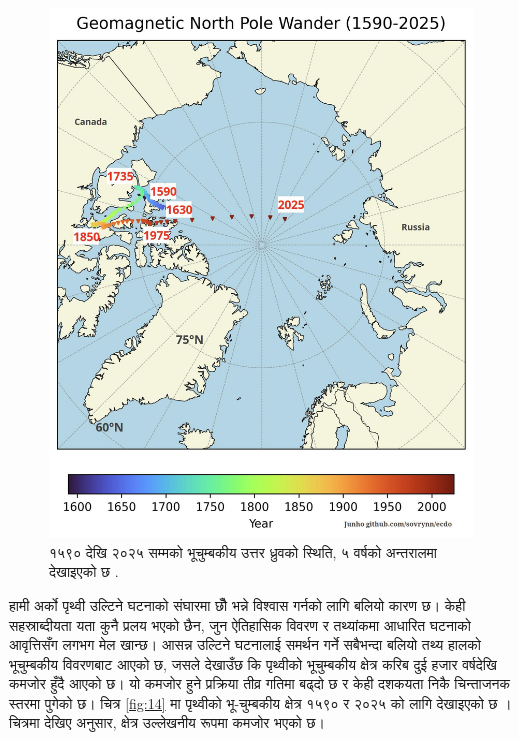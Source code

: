 \documentclass[10pt,twocolumn,letterpaper]{article}
\begin{document}
\begin{figure}[t]
\begin{center}
   \includegraphics[width=1\linewidth]{npw.jpg}
\end{center}
   \caption{१५९० देखि २०२५ सम्मको भूचुम्बकीय उत्तर ध्रुवको स्थिति, ५ वर्षको अन्तरालमा देखाइएको छ \cite{142}.}
\label{fig:13}
\label{fig:onecol}
\end{figure}

हामी अर्को पृथ्वी उल्टिने घटनाको संघारमा छौँ भन्ने विश्वास गर्नको लागि बलियो कारण छ। केही सहस्राब्दीयता यता कुनै प्रलय भएको छैन, जुन ऐतिहासिक विवरण र तथ्यांकमा आधारित घटनाको आवृत्तिसँग लगभग मेल खान्छ। आसन्न उल्टिने घटनालाई समर्थन गर्ने सबैभन्दा बलियो तथ्य हालको भूचुम्बकीय विवरणबाट आएको छ, जसले देखाउँछ कि पृथ्वीको भूचुम्बकीय क्षेत्र करिब दुई हजार वर्षदेखि कमजोर हुँदै आएको छ। यो कमजोर हुने प्रक्रिया तीव्र गतिमा बढ्दो छ र केही दशकयता निकै चिन्ताजनक स्तरमा पुगेको छ।
चित्र \ref{fig:14} मा पृथ्वीको भू-चुम्बकीय क्षेत्र १५९० र २०२५ को लागि देखाइएको छ \cite{125,126}। चित्रमा देखिए अनुसार, क्षेत्र उल्लेखनीय रूपमा कमजोर भएको छ।
\end{document}
